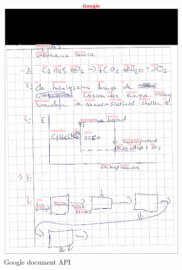 \documentclass[12pt]{article}
\begin{document}
\begin{multicols}{2}
\begin{figure}
    \centering
    \includegraphics[width=1\linewidth]{./images/methoden/inscannen/sectie/hand/google.png}
    \caption{Google document API}\label{fig:google-doc-api}
\end{figure}
\begin{figure}
    \centering

\end{figure}
\end{multicols}
\end{document}

